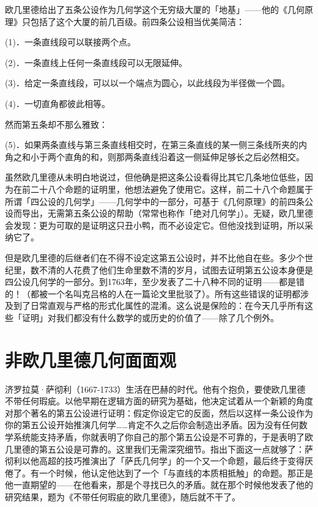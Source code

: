 \documentclass[
  12pt,
  twoside,
  openright,
  oldfontcommands,
]{memoir}
\begin{document}
欧几里德给出了五条公设作为几何学这个无穷级大厦的「地基」------他的《几何原理》只包括了这个大厦的前几百级。前四条公设相当优美简洁：

(1)．一条直线段可以联接两个点。

(2)．一条直线上任何一条直线段可以无限延伸。

(3)．给定一条直线段，可以以一个端点为圆心，以此线段为半径做一个圆。

(4)．一切直角都彼此相等。

然而第五条却不那么雅致：

(5)．如果两条直线与第三条直线相交时，在第三条直线的某一侧三条线所夹的内角之和小于两个直角的和，则那两条直线沿着这一侧延伸足够长之后必然相交。

虽然欧几里德从未明白地说过，但他确是把这条公设看得比其它几条地位低些，因为在前二十八个命题的证明里，他想法避免了使用它。这样，前二十八个命题属于所谓「四公设的几何学」------几何学中的一部分，可基于《几何原理》的前四条公设而导出，无需第五条公设的帮助（常常也称作「绝对几何学」）。无疑，欧几里德会发现：更为可取的是证明这只丑小鸭，而不必设定它。但他没找到证明，所以采纳它了。

但是欧几里德的后继者们在不得不设定这第五公设时，并不比他自在些。多少个世纪里，数不清的人花费了他们生命里数不清的岁月，试图去证明第五公设本身便是四公设几何学的一部分。到1763年，至少发表了二十八种不同的证明------都是错的！（都被一个名叫克吕格的人在一篇论文里批驳了）。所有这些错误的证明都涉及到了日常直观与严格的形式化属性的混淆。这么说是保险的：在今天几乎所有这些「证明」对我们都没有什么数学的或历史的价值了------除了几个例外。

\section{非欧几里德几何面面观}

济罗拉莫·萨彻利（1667-1733）生活在巴赫的时代。他有个抱负，要使欧几里德不带任何瑕疵。以他早期在逻辑方面的研究为基础，他决定试着从一个新颖的角度对那个著名的第五公设进行证明：假定你设定它的反面，然后以这样一条公设作为你的第五公设开始推演几何学\ldots\ldots 肯定不久之后你会制造出矛盾。因为没有任何数学系统能支持矛盾，你就表明了你自己的那个第五公设是不可靠的，于是表明了欧几里德的第五公设是可靠的。这里我们无需深究细节。指出下面这一点就够了：萨彻利以他高超的技巧推演出了「萨氏几何学」的一个又一个命题，最后终于变得厌倦了。有一个时候，他认定他达到了一个「与直线的本质相抵触」的命题。那正是他一直期望的------在他看来，那是个寻找已久的矛盾。就在那个时候他发表了他的研究结果，题为《不带任何瑕疵的欧几里德》，随后就不干了。
\end{document}
